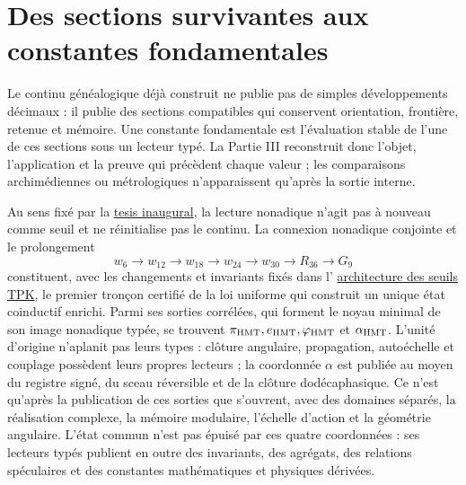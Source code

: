 \section*{Des sections survivantes aux constantes fondamentales}

Le continu généalogique déjà construit ne publie pas de simples développements décimaux : il publie des sections compatibles qui conservent orientation, frontière, retenue et mémoire. Une constante fondamentale est l'évaluation stable de l'une de ces sections sous un lecteur typé. La Partie III reconstruit donc l'objet, l'application et la preuve qui précèdent chaque valeur ; les comparaisons archimédiennes ou métrologiques n'apparaissent qu'après la sortie interne.

Au sens fixé par la
\hyperref[sec:tesis-inaugural-helicoidal-hmt-md]{tesis inaugural}, la lecture
nonadique n'agit pas à nouveau comme seuil et ne réinitialise pas le continu. La connexion nonadique conjointe et le prolongement
\[
w_6\longrightarrow w_{12}\longrightarrow w_{18}\longrightarrow w_{24}\longrightarrow w_{30}\longrightarrow R_{36}\longrightarrow G_9
\]
constituent, avec les changements et invariants fixés dans l'
\hyperref[sec:umbrales-prolongacion-tpk-inaugural]{architecture des seuils
TPK}, le premier tronçon certifié de la loi uniforme qui construit un unique
état coinductif enrichi. Parmi ses sorties corrélées, qui forment
le noyau minimal de son image nonadique typée, se trouvent
\(\pi_{\rm HMT},e_{\rm HMT},\varphi_{\rm HMT}\) et \(\alpha_{\rm HMT}\). L'unité d'origine n'aplanit pas leurs types : clôture angulaire, propagation, autoéchelle et couplage possèdent leurs propres lecteurs ; la coordonnée \(\alpha\) est publiée au moyen du registre signé, du sceau réversible et de la clôture dodécaphasique. Ce n'est qu'après la publication de ces sorties que s'ouvrent, avec des domaines séparés, la réalisation complexe, la mémoire modulaire, l'échelle d'action et la géométrie angulaire. L'état commun n'est pas épuisé par ces quatre coordonnées : ses lecteurs typés publient en outre des invariants, des agrégats, des relations spéculaires et des constantes mathématiques et physiques dérivées.
